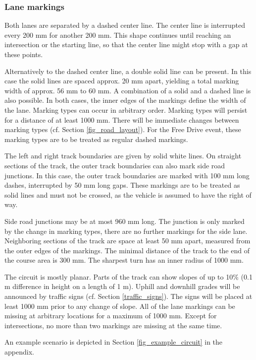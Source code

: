 \subsubsection{Lane markings}
\label{lane_markings}

Both lanes are separated by a dashed center line. The center line is
interrupted every 200 mm for another 200 mm. This shape continues until
reaching an intersection or the starting line, so that the center line might
stop with a gap at these points.

Alternatively to the dashed center line, a double solid line can be present. In
this case the solid lines are spaced approx. 20 mm apart, yielding a total
marking width of approx. 56 mm to 60 mm. A combination of a solid and a dashed
line is also possible. In both cases, the inner edges of the markings define
the width of the lane. Marking types can occur in arbitrary order. Marking
types will persist for a distance of at least 1000 mm. There will be immediate
changes between marking types (cf. Section \ref{fig_road_layout}). For the Free
Drive event, these marking types are to be treated as regular dashed markings.

The left and right track boundaries are given by solid white lines. On straight
sections of the track, the outer track boundaries can also mark side road
junctions. In this case, the outer track boundaries are marked with 100 mm long
dashes, interrupted by 50 mm long gaps. These markings are to be treated as
solid lines and must not be crossed, as the vehicle is assumed to have the
right of way.

Side road junctions may be at most 960 mm long. The junction is only marked by
the change in marking types, there are no further markings for the side lane.
Neighboring sections of the track are space at least 50 mm apart, measured from
the outer edges of the markings. The minimal distance of the track to the end
of the course area is 300 mm. The sharpest turn has an inner radius of 1000 mm.

The circuit is mostly planar. Parts of the track can show slopes of up to 10\%
(0.1 m difference in height on a length of 1 m). Uphill and downhill grades
will be announced by traffic signs (cf. Section \ref{traffic_signs}). The signs
will be placed at least 1000 mm prior to any change of slope. All of the lane
markings can be missing at arbitrary locations for a maximum of 1000 mm. Except
for intersections, no more than two markings are missing at the same time.

An example scenario is depicted in Section \ref{fig_example_circuit} in the
appendix.


